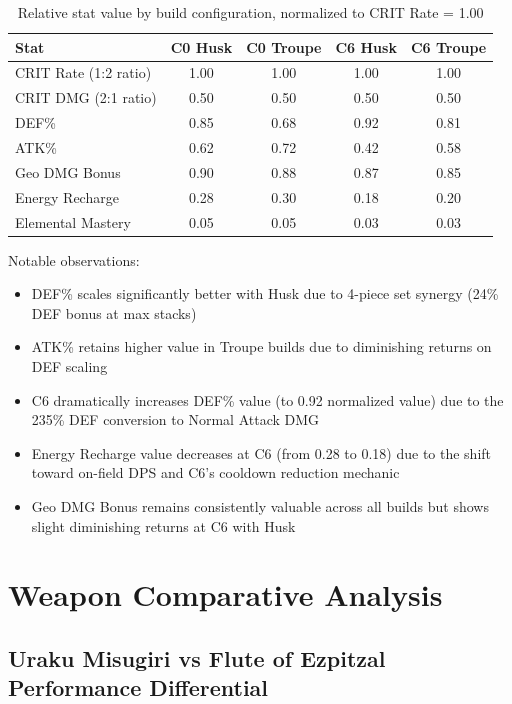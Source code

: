 \documentclass[12pt,a4paper]{article}
\begin{document}
\begin{table}[h]
\centering
\begin{tabular}{lcccc}
\toprule
\textbf{Stat} & \textbf{C0 Husk} & \textbf{C0 Troupe} & \textbf{C6 Husk} & \textbf{C6 Troupe} \\
\midrule
CRIT Rate (1:2 ratio) & 1.00 & 1.00 & 1.00 & 1.00 \\
CRIT DMG (2:1 ratio) & 0.50 & 0.50 & 0.50 & 0.50 \\
DEF\% & 0.85 & 0.68 & 0.92 & 0.81 \\
ATK\% & 0.62 & 0.72 & 0.42 & 0.58 \\
Geo DMG Bonus & 0.90 & 0.88 & 0.87 & 0.85 \\
Energy Recharge & 0.28 & 0.30 & 0.18 & 0.20 \\
Elemental Mastery & 0.05 & 0.05 & 0.03 & 0.03 \\
\bottomrule
\end{tabular}
\caption{Relative stat value by build configuration, normalized to CRIT Rate = 1.00}
\label{tab:stat_priority}
\end{table}

Notable observations:
\begin{itemize}
    \item DEF\% scales significantly better with Husk due to 4-piece set synergy (24\% DEF bonus at max stacks)
    \item ATK\% retains higher value in Troupe builds due to diminishing returns on DEF scaling
    \item C6 dramatically increases DEF\% value (to 0.92 normalized value) due to the 235\% DEF conversion to Normal Attack DMG
    \item Energy Recharge value decreases at C6 (from 0.28 to 0.18) due to the shift toward on-field DPS and C6's cooldown reduction mechanic
    \item Geo DMG Bonus remains consistently valuable across all builds but shows slight diminishing returns at C6 with Husk
\end{itemize}

\section{Weapon Comparative Analysis}

\subsection{Uraku Misugiri vs Flute of Ezpitzal Performance Differential}
\end{document}
